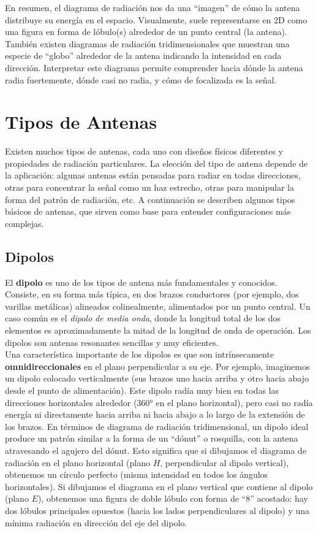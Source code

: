En resumen, el diagrama de radiación nos da una “imagen” de cómo la antena distribuye su energía en el espacio. Visualmente, suele representarse en 2D como una figura en forma de lóbulo(s) alrededor de un punto central (la antena). También existen diagramas de radiación tridimensionales que muestran una especie de “globo” alrededor de la antena indicando la intensidad en cada dirección. Interpretar este diagrama permite comprender hacia dónde la antena radia fuertemente, dónde casi no radia, y cómo de focalizada es la señal.

\section{Tipos de Antenas}

Existen muchos tipos de antenas, cada uno con diseños físicos diferentes y propiedades de radiación particulares. La elección del tipo de antena depende de la aplicación: algunas antenas están pensadas para radiar en todas direcciones, otras para concentrar la señal como un haz estrecho, otras para manipular la forma del patrón de radiación, etc. A continuación se describen algunos tipos básicos de antenas, que sirven como base para entender configuraciones más complejas.

\subsection{Dipolos}

El \textbf{dipolo} es uno de los tipos de antena más fundamentales y conocidos. Consiste, en su forma más típica, en dos brazos conductores (por ejemplo, dos varillas metálicas) alineados colinealmente, alimentados por un punto central. Un caso común es el \textit{dipolo de media onda}, donde la longitud total de los dos elementos es aproximadamente la mitad de la longitud de onda de operación. Los dipolos son antenas resonantes sencillas y muy eficientes.\\

Una característica importante de los dipolos es que son intrínsecamente \textbf{omnidireccionales} en el plano perpendicular a su eje. Por ejemplo, imaginemos un dipolo colocado verticalmente (sus brazos uno hacia arriba y otro hacia abajo desde el punto de alimentación). Este dipolo radía muy bien en todas las direcciones horizontales alrededor (360° en el plano horizontal), pero casi no radía energía ni directamente hacia arriba ni hacia abajo a lo largo de la extensión de los brazos. En términos de diagrama de radiación tridimensional, un dipolo ideal produce un patrón similar a la forma de un “dónut” o rosquilla, con la antena atravesando el agujero del dónut. Esto significa que si dibujamos el diagrama de radiación en el plano horizontal (plano $H$, perpendicular al dipolo vertical), obtenemos un círculo perfecto (misma intensidad en todos los ángulos horizontales). Si dibujamos el diagrama en el plano vertical que contiene al dipolo (plano $E$), obtenemos una figura de doble lóbulo con forma de “8” acostado: hay dos lóbulos principales opuestos (hacia los lados perpendiculares al dipolo) y una mínima radiación en dirección del eje del dipolo.\\

